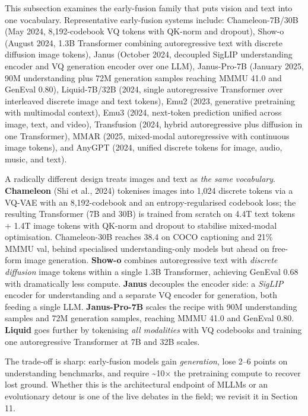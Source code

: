 \documentclass{article}
\begin{document}
This subsection examines the early-fusion family that puts vision and text into one vocabulary. Representative early-fusion systems include: Chameleon-7B/30B (May 2024, 8,192-codebook VQ tokens with QK-norm and dropout), Show-o (August 2024, 1.3B Transformer combining autoregressive text with discrete diffusion image tokens), Janus (October 2024, decoupled SigLIP understanding encoder and VQ generation encoder over one LLM), Janus-Pro-7B (January 2025, 90M understanding plus 72M generation samples reaching MMMU 41.0 and GenEval 0.80), Liquid-7B/32B (2024, single autoregressive Transformer over interleaved discrete image and text tokens), Emu2 (2023, generative pretraining with multimodal context), Emu3 (2024, next-token prediction unified across image, text, and video), Transfusion (2024, hybrid autoregressive plus diffusion in one Transformer), MMAR (2025, mixed-modal autoregressive with continuous image tokens), and AnyGPT (2024, unified discrete tokens for image, audio, music, and text).

A radically different design treats images and text as \emph{the same vocabulary}. \textbf{Chameleon} (Shi et al., 2024) tokenises images into 1,024 discrete tokens via a VQ-VAE with an 8,192-codebook and an entropy-regularised codebook loss; the resulting Transformer (7B and 30B) is trained from scratch on 4.4T text tokens + 1.4T image tokens with QK-norm and dropout to stabilise mixed-modal optimisation. Chameleon-30B reaches 38.4 on COCO captioning and 21\% MMMU val, behind specialised understanding-only models but ahead on free-form image generation. \textbf{Show-o} \citep{xie20242024} combines autoregressive text with \emph{discrete diffusion} image tokens within a single 1.3B Transformer, achieving GenEval 0.68 with dramatically less compute. \textbf{Janus} \citep{wu20242024} decouples the encoder side: a \emph{SigLIP} encoder for understanding and a separate VQ encoder for generation, both feeding a single LLM. \textbf{Janus-Pro-7B} \citep{chen20252025} scales the recipe with 90M understanding samples and 72M generation samples, reaching MMMU 41.0 and GenEval 0.80. \textbf{Liquid} \citep{wu20242024} goes further by tokenising \emph{all modalities} with VQ codebooks and training one autoregressive Transformer at 7B and 32B scales.

The trade-off is sharp: early-fusion models gain \emph{generation}, lose 2--6 points on understanding benchmarks, and require \textasciitilde10× the pretraining compute to recover lost ground. Whether this is the architectural endpoint of MLLMs or an evolutionary detour is one of the live debates in the field; we revisit it in Section 11.
\end{document}
